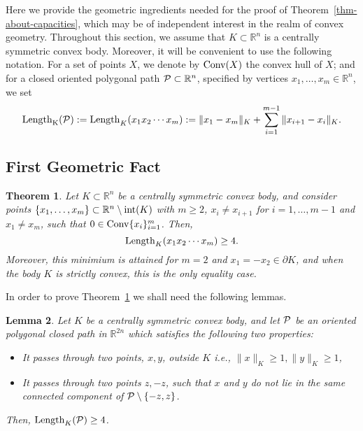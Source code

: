\documentclass[11pt]{article}
\def\RR{\mathbb{R}}
\newtheorem{lemma}{Lemma}[section]
\newtheorem{theorem}[lemma]{Theorem}
\begin{document}
{Here we provide the geometric ingredients needed for the proof of Theorem~\ref{thm-about-capacities},
which may be of independent interest in the realm of convex geometry.
Throughout this section, we assume that $K \subset {\mathbb R}^n$ is a centrally symmetric convex body. Moreover, 
it will be convenient to use the following notation. For a set of points $X$, we denote by ${\rm Conv}(X)$ the convex hull of $X$; and
for a closed oriented polygonal path ${\cal P} \subset {\mathbb R}^{n}$, specified by vertices $x_1, \ldots, x_{m}\in \RR^n$,  we set 
\[{\rm {\rm Length}_K({\cal P}):=
Length}_K(x_1 x_2 \cdots x_{m}):=  \|x_1 - x_{m} \|_K + \sum_{i=1}^{m-1} \| x_{i+1}-x_i
\|_K.\]

\subsection{First Geometric Fact}\label{sec:0inconv}


\begin{theorem}\label{thm-about-Klengths}
Let $K\subset \RR^n$ be a centrally symmetric convex body, and consider points
$\{x_1, \ldots, x_{m}\}\subset \RR^n\setminus {\rm int}(K)$ with $m\ge 2$, $x_i\neq x_{i+1}$ for $i=1,\ldots, m-1$ and $x_1\neq x_m$, such that $0 \in {\rm Conv}\{x_i\}_{i=1}^{m}$. 
Then, $$
{\rm Length}_K(x_1 x_2 \cdots x_{m}) \geq 4.$$
Moreover, this minimium is attained for $m=2$ and $x_1=-x_2\in \partial K$, and when the body $K$ is strictly convex, this is the only equality case. 
\end{theorem}






In order to prove Theorem~\ref{thm-about-Klengths} we
shall need the following  lemmas.  

\begin{lemma}\label{lem:length-of-path-between-xpy-p}
Let $K$ be a centrally symmetric convex body, and let ${\cal P}$ be an
oriented polygonal closed path in ${\mathbb R}^{2n}$ which satisfies the following two
properties:

\begin{itemize}

\item It passes through two points, $x,y$, outside
$K$ i.e., $\|x\|_K\ge 1, \|y\|_K \ge 1$,

\item It passes through two points $z, -z$, such that $x$ and $y$ do not lie in 
the same connected component of ${\cal P} \setminus \{-z,z\}$.
\end{itemize}
Then,  ${\rm Length}_K({\cal P}) \ge 4$.
\end{lemma}

}
\end{document}
